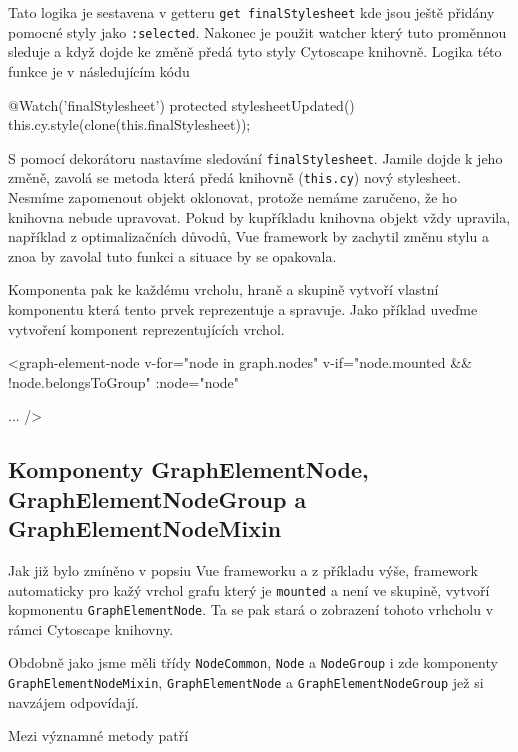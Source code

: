 Tato logika je sestavena v getteru \texttt{get finalStylesheet} kde jsou ještě přidány pomocné styly jako \texttt{:selected}. Nakonec je použit watcher který tuto proměnnou sleduje a když dojde ke změně předá tyto styly Cytoscape knihovně. Logika této funkce je v následujícím kódu
\begin{code}
@Watch('finalStylesheet')
protected stylesheetUpdated() {
    this.cy.style(clone(this.finalStylesheet));
}
\end{code}
S pomocí dekorátoru nastavíme sledování \texttt{finalStylesheet}. Jamile dojde k jeho změně, zavolá se metoda která předá knihovně (\texttt{this.cy}) nový stylesheet. Nesmíme zapomenout objekt oklonovat, protože nemáme zaručeno, že ho knihovna nebude upravovat. Pokud by kupříkladu knihovna objekt vždy upravila, například z optimalizačních důvodů, Vue framework by zachytil změnu stylu a znoa by zavolal tuto funkci a situace by se opakovala.

\bigskip
Komponenta pak ke každému vrcholu, hraně a skupině vytvoří vlastní komponentu která tento prvek reprezentuje a spravuje. Jako příklad uveďme vytvoření komponent reprezentujících vrchol.

\begin{code}
<graph-element-node
  v-for="node in graph.nodes"
  v-if="node.mounted && !node.belongsToGroup"
  :node="node"

  ...
/>
\end{code}

\subsection{Komponenty GraphElementNode, GraphElementNodeGroup a GraphElementNodeMixin}
Jak již bylo zmíněno v popsiu Vue frameworku a z příkladu výše, framework automaticky pro kažý vrchol grafu který je \texttt{mounted} a není ve skupině, vytvoří kopmonentu \texttt{GraphElementNode}. Ta se pak stará o zobrazení tohoto vrhcholu v rámci Cytoscape knihovny.

Obdobně jako jsme měli třídy \texttt{NodeCommon}, \texttt{Node} a \texttt{NodeGroup} i zde komponenty \texttt{GraphElementNodeMixin}, \texttt{GraphElementNode} a \texttt{GraphElementNodeGroup} jež si navzájem odpovídají.

Mezi významné metody patří

